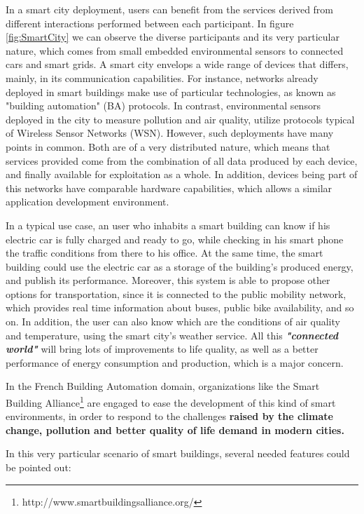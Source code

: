 In a smart city deployment\cite{smartsantander}, users can benefit from the services derived from different interactions performed between each participant.
In figure \ref{fig:SmartCity} we can observe the diverse participants and its very particular nature, which comes from small embedded environmental sensors to connected cars and smart grids.
A smart city envelops a wide range of devices that differs, mainly, in its communication capabilities.
For instance, networks already deployed in smart buildings make use of particular technologies, as known as "building automation" (BA) protocols.
In contrast, environmental sensors deployed in the city to measure pollution and air quality, utilize protocols typical of Wireless Sensor Networks (WSN)\cite{Akyildiz2002WSN}.
However, such deployments have many points in common.
Both are of a very distributed nature, which means that services provided come from the combination of all data produced by each device, and finally available for exploitation as a whole.
In addition, devices being part of this networks have comparable hardware capabilities, which allows a similar application development environment.

In a typical use case, an user who inhabits a smart building can know if his electric car is fully charged and ready to go, while checking in his smart phone the traffic conditions from there to his office.
At the same time, the smart building could use the electric car as a storage of the building's produced energy, and publish its performance.
Moreover, this system is able to propose other options for transportation, since it is connected to the public mobility network, which provides real time information about buses, public bike availability, and so on.
In addition, the user can also know which are the conditions of air quality and temperature, using the smart city's weather service.
All this \textit{\textbf{"connected world"}} will bring lots of improvements to life quality, as well as a better performance of energy consumption and production, which is a major concern.

In the French Building Automation domain, organizations like the Smart Building Alliance\footnote{http://www.smartbuildingsalliance.org/} are engaged to ease the development of this kind of smart environments, in order to respond to the challenges \textbf{raised by the climate change, pollution and better quality of life demand in modern cities.}

In this very particular scenario of smart buildings, several needed features could be pointed out:

